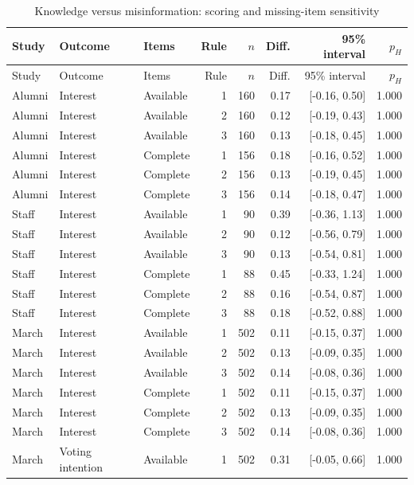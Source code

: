 \begin{longtable}{lllrrrrr}
\caption{Knowledge versus misinformation: scoring and missing-item sensitivity}\label{tab:beliefcontrasts}\\
\toprule
Study & Outcome & Items & Rule & $n$ & Diff. & 95\% interval & $p_H$ \\
\midrule
\endfirsthead
\toprule
Study & Outcome & Items & Rule & $n$ & Diff. & 95\% interval & $p_H$ \\
\midrule
\endhead
\bottomrule
\endlastfoot
Alumni & Interest & Available & 1 & 160 & 0.17 & [-0.16, 0.50] & 1.000 \\
Alumni & Interest & Available & 2 & 160 & 0.12 & [-0.19, 0.43] & 1.000 \\
Alumni & Interest & Available & 3 & 160 & 0.13 & [-0.18, 0.45] & 1.000 \\
Alumni & Interest & Complete & 1 & 156 & 0.18 & [-0.16, 0.52] & 1.000 \\
Alumni & Interest & Complete & 2 & 156 & 0.13 & [-0.19, 0.45] & 1.000 \\
Alumni & Interest & Complete & 3 & 156 & 0.14 & [-0.18, 0.47] & 1.000 \\
Staff & Interest & Available & 1 &  90 & 0.39 & [-0.36, 1.13] & 1.000 \\
Staff & Interest & Available & 2 &  90 & 0.12 & [-0.56, 0.79] & 1.000 \\
Staff & Interest & Available & 3 &  90 & 0.13 & [-0.54, 0.81] & 1.000 \\
Staff & Interest & Complete & 1 &  88 & 0.45 & [-0.33, 1.24] & 1.000 \\
Staff & Interest & Complete & 2 &  88 & 0.16 & [-0.54, 0.87] & 1.000 \\
Staff & Interest & Complete & 3 &  88 & 0.18 & [-0.52, 0.88] & 1.000 \\
March & Interest & Available & 1 & 502 & 0.11 & [-0.15, 0.37] & 1.000 \\
March & Interest & Available & 2 & 502 & 0.13 & [-0.09, 0.35] & 1.000 \\
March & Interest & Available & 3 & 502 & 0.14 & [-0.08, 0.36] & 1.000 \\
March & Interest & Complete & 1 & 502 & 0.11 & [-0.15, 0.37] & 1.000 \\
March & Interest & Complete & 2 & 502 & 0.13 & [-0.09, 0.35] & 1.000 \\
March & Interest & Complete & 3 & 502 & 0.14 & [-0.08, 0.36] & 1.000 \\
March & Voting intention & Available & 1 & 502 & 0.31 & [-0.05, 0.66] & 1.000 \\

\end{longtable}
